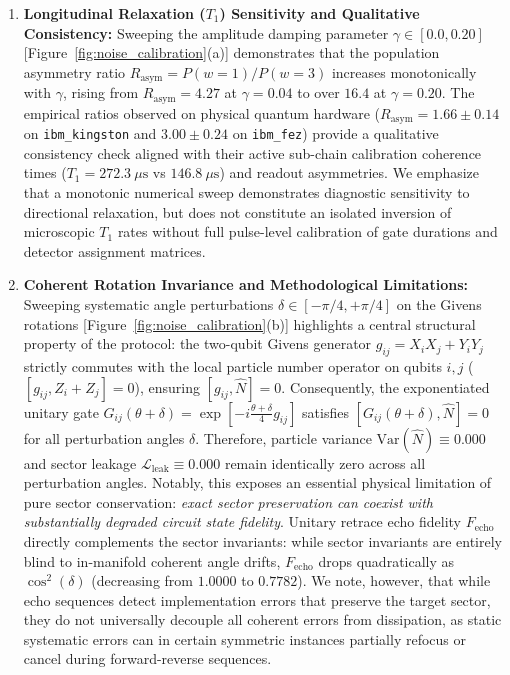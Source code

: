 \documentclass[aps,pra,reprint,superscriptaddress,floatfix,nofootinbib]{revtex4-2}
\begin{document}
\begin{enumerate}
    \item \textbf{Longitudinal Relaxation ($T_1$) Sensitivity and Qualitative Consistency:} Sweeping the amplitude damping parameter $\gamma \in [0.0, 0.20]$ [Figure~\ref{fig:noise_calibration}(a)] demonstrates that the population asymmetry ratio $R_{\text{asym}} = P(w=1)/P(w=3)$ increases monotonically with $\gamma$, rising from $R_{\text{asym}} = 4.27$ at $\gamma = 0.04$ to over $16.4$ at $\gamma = 0.20$. The empirical ratios observed on physical quantum hardware ($R_{\text{asym}} = 1.66 \pm 0.14$ on \texttt{ibm\_kingston} and $3.00 \pm 0.24$ on \texttt{ibm\_fez}) provide a qualitative consistency check aligned with their active sub-chain calibration coherence times ($T_1 = 272.3\ \mu\text{s}$ vs $146.8\ \mu\text{s}$) and readout asymmetries. We emphasize that a monotonic numerical sweep demonstrates diagnostic sensitivity to directional relaxation, but does not constitute an isolated inversion of microscopic $T_1$ rates without full pulse-level calibration of gate durations and detector assignment matrices.
    
    \item \textbf{Coherent Rotation Invariance and Methodological Limitations:} Sweeping systematic angle perturbations $\delta \in [-\pi/4, +\pi/4]$ on the Givens rotations [Figure~\ref{fig:noise_calibration}(b)] highlights a central structural property of the protocol: the two-qubit Givens generator $g_{ij} = X_i X_j + Y_i Y_j$ strictly commutes with the local particle number operator on qubits $i, j$ ($[g_{ij}, Z_i + Z_j] = 0$), ensuring $[g_{ij}, \hat{N}] = 0$. Consequently, the exponentiated unitary gate $G_{ij}(\theta + \delta) = \exp[-i \frac{\theta + \delta}{4} g_{ij}]$ satisfies $[G_{ij}(\theta + \delta), \hat{N}] = 0$ for all perturbation angles $\delta$. Therefore, particle variance $\text{Var}(\hat{N}) \equiv 0.000$ and sector leakage $\mathcal{L}_{\text{leak}} \equiv 0.000$ remain identically zero across all perturbation angles. Notably, this exposes an essential physical limitation of pure sector conservation: \emph{exact sector preservation can coexist with substantially degraded circuit state fidelity}. Unitary retrace echo fidelity $F_{\text{echo}}$ directly complements the sector invariants: while sector invariants are entirely blind to in-manifold coherent angle drifts, $F_{\text{echo}}$ drops quadratically as $\cos^2(\delta)$ (decreasing from $1.0000$ to $0.7782$). We note, however, that while echo sequences detect implementation errors that preserve the target sector, they do not universally decouple all coherent errors from dissipation, as static systematic errors can in certain symmetric instances partially refocus or cancel during forward-reverse sequences.
    

\end{enumerate}
\end{document}

